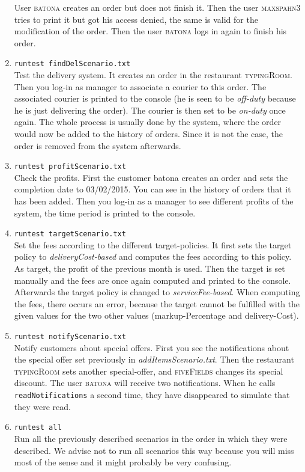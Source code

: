 \begin{enumerate}[itemsep=0mm]
		User \textsc{batona} creates an order but 
		does not finish it. Then the user \textsc{maxspahn3} tries to print it but got his
		access denied, the same is valid for the modification of the order. Then the 
		user \textsc{batona} logs in again to finish his order.
	\item \lstinline|runtest findDelScenario.txt| \\
		Test the delivery system. It creates
		an order in the restaurant \textsc{typingRoom}. Then you log-in as manager to 
		associate a courier to this order. The associated courier is printed to the console 
		(he is seen to be \textit{off-duty} because he is just delivering the order). 
		The courier is then set to be \textit{on-duty} once again. The whole process is 
		usually done by the system, where the order would now be added to the history of 
		orders. Since it is not the case, the order is removed from the system afterwards.
	\item \lstinline|runtest profitScenario.txt| \\ 
		Check the profits. First the customer batona creates an order and sets the completion
		date to \textsc{03/02/2015}. You can see in the history of orders that it has been added.
		Then you log-in as a manager to see different profits of the system,
		the time period is printed to the console.
	\item \lstinline|runtest targetScenario.txt| \\
		Set the fees according to the different target-policies. It first sets the target policy to
		\textit{deliveryCost-based} and computes the fees according to this policy. As 
		target, the profit of the previous month is used. Then the target is set manually and
		the fees are once again computed and printed to the console. Afterwards the 
		target policy is changed to \textit{serviceFee-based}. When computing the fees, there
		occurs an error, because the target cannot be fulfilled with the given values for 
		the two other values (markup-Percentage and delivery-Cost).
	\item \lstinline|runtest notifyScenario.txt| \\
		Notify customers about special offers. First you see the notifications about the 
		special offer set previously in \textit{addItemsScenario.txt}. Then the restaurant
		\textsc{typingRoom} sets another special-offer, and \textsc{fiveFields} changes its
		special discount. The user \textsc{batona} will receive two notifications. When he 
		calls \lstinline|readNotifications| a second time, they have disappeared to 
		simulate that they were read.
	\item \lstinline|runtest all| \\
		Run all the previously described scenarios in the order in which they were 
		described. We advise not to run all scenarios this way because you will
		miss most of the sense and it might probably be very confusing.
\end{enumerate}

